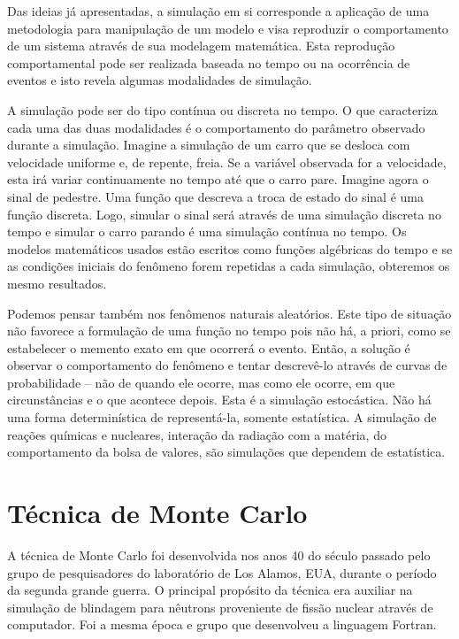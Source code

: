 \documentclass[a4paper,12pt,oneside,onecolumn]{uerj/uerj}
\begin{document}
Das ideias já apresentadas, a simulação em si corresponde a aplicação de uma metodologia para manipulação de um modelo e visa reproduzir o comportamento de um sistema através de sua modelagem matemática. Esta reprodução comportamental pode ser realizada baseada no tempo ou na ocorrência de eventos e isto revela algumas modalidades de simulação.

A simulação pode ser do tipo contínua ou discreta no tempo. O que caracteriza cada uma das duas modalidades é o comportamento do parâmetro observado durante a simulação. Imagine a simulação de um carro que se desloca com velocidade uniforme e, de repente, freia. Se a variável observada for a velocidade, esta irá variar continuamente no tempo até que o carro pare. Imagine agora o sinal de pedestre. Uma função que descreva a troca de estado do sinal é uma função discreta. Logo, simular o sinal será através de uma simulação discreta no tempo e simular o carro parando é uma simulação contínua no tempo. Os modelos matemáticos usados estão escritos como funções algébricas do tempo e se as condições iniciais do fenômeno forem repetidas a cada simulação, obteremos os mesmo resultados.

Podemos pensar também nos fenômenos naturais aleatórios. Este tipo de situação não favorece a formulação de uma função no tempo pois não há, a priori, como se estabelecer o memento exato em que ocorrerá o evento. Então, a solução é observar o comportamento do fenômeno e tentar descrevê-lo através de curvas de probabilidade -- não de quando ele ocorre, mas como ele ocorre, em que circunstâncias e o que acontece depois. Esta é a simulação estocástica. Não há uma forma determinística de representá-la, somente estatística. A simulação de reações químicas e nucleares, interação da radiação com a matéria, do comportamento da bolsa de valores, são simulações que dependem de estatística.

\section{Técnica de Monte Carlo}

A técnica de Monte Carlo foi desenvolvida nos anos 40 do século passado pelo grupo de pesquisadores do laboratório de Los Alamos, EUA, durante o período da segunda grande guerra. O principal propósito da técnica era auxiliar na simulação de blindagem para nêutrons proveniente de fissão nuclear através de computador. Foi a mesma época e grupo que desenvolveu a linguagem Fortran.
\end{document}
